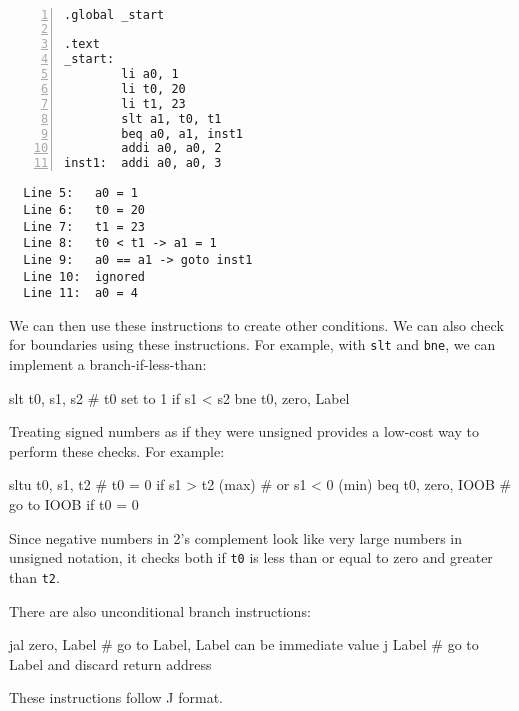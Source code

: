 \begin{eg}~

\begin{minipage}{0.5\textwidth}
\begin{Verbatim}[numbers=left,xleftmargin=5mm]
.global _start

.text
_start:
        li a0, 1
        li t0, 20
        li t1, 23
        slt a1, t0, t1
        beq a0, a1, inst1
        addi a0, a0, 2
inst1:  addi a0, a0, 3
\end{Verbatim}
\end{minipage}
\begin{minipage}{0.5\textwidth}
\color{red}
\begin{verbatim}
  Line 5:   a0 = 1
  Line 6:   t0 = 20
  Line 7:   t1 = 23
  Line 8:   t0 < t1 -> a1 = 1
  Line 9:   a0 == a1 -> goto inst1
  Line 10:  ignored
  Line 11:  a0 = 4
\end{verbatim}
\end{minipage}
\end{eg}

We can then use these instructions to create other conditions. We can also check for boundaries using these instructions. For example, with \verb|slt| and \verb|bne|, we can implement a branch-if-less-than:
\begin{codeBlock}
  slt t0, s1, s2        # t0 set to 1 if s1 < s2
  bne t0, zero, Label
\end{codeBlock}

Treating signed numbers as if they were unsigned provides a low-cost way to perform these checks. For example:
\begin{codeBlock}
  sltu t0, s1, t2       # t0 = 0 if s1 > t2 (max)
                        # or s1 < 0 (min)
  beq t0, zero, IOOB    # go to IOOB if t0 = 0
\end{codeBlock}

Since negative numbers in 2's complement look like very large numbers in unsigned notation, it checks both if \verb|t0| is less than or equal to zero and greater than \verb|t2|. 

There are also unconditional branch instructions:
\begin{codeBlock}
  jal zero, Label   # go to Label, Label can be immediate value
  j Label           # go to Label and discard return address
\end{codeBlock}

These instructions follow J format. 

